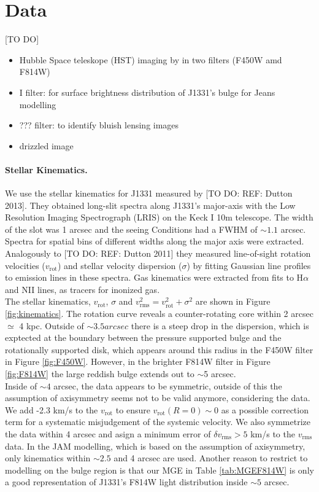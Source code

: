 \section{Data} \label{sec:data}

[TO DO]

\begin{itemize}
\item Hubble Space teleskope (HST) imaging by \cite{SWELLSI} in two filters (F450W amd F814W)
\item I filter: for surface brightness distribution of J1331's bulge for Jeans modelling
\item ??? filter: to identify bluish lensing images
\item drizzled image
\end{itemize}

\paragraph{Stellar Kinematics.} We use the stellar kinematics for J1331 measured by [TO DO: REF: Dutton 2013]. They obtained long-slit spectra along J1331's major-axis with the Low Resolution Imaging Spectrograph (LRIS) on the Keck I 10m telescope. The width of the slot was 1 arcsec and the seeing Conditions had a FWHM of $\sim 1.1$ arcsec. Spectra for spatial bins of different widths along the major axis were extracted. Analogously to [TO DO: REF: Dutton 2011] they measured line-of-sight rotation velocities ($v_\text{rot}$) and stellar velocity dispersion ($\sigma$) by fitting Gaussian line profiles to emission lines in these spectra. Gas kinematics were extracted from fits to H$\alpha$ and NII lines, as tracers for inonized gas.
\\The stellar kinematics, $v_\text{rot}$, $\sigma$ and $v_\text{rms}^2=v_\text{rot}^2 + \sigma^2$ are shown in Figure \ref{fig:kinematics}. The rotation curve reveals a counter-rotating core within 2 arcsec $\simeq$ 4 kpc. Outside of $\sim 3.5 arcsec$ there is a steep drop in the dispersion, which is exptected at the boundary between the pressure supported bulge and the rotationally supported disk, which appears around this radius in the F450W filter in Figure \ref{fig:F450W}. However, in the brighter F814W filter in Figure \ref{fig:F814W}  the large reddish bulge extends out to $\sim$5 arcsec. 
\\Inside of $\sim 4$ arcsec, the data appears to be symmetric, outside of this the assumption of axisymmetry seems not to be valid anymore, considering the data. We add -2.3 km/s to the $v_\text{rot}$ to ensure $v_\text{rot}(R=0) \sim 0$ as a possible correction term for a systematic misjudgement of the systemic velocity. We also symmetrize the data within 4 arcsec and asign a minimum error of $\delta v_\text{rms} > 5$ km/s to the $v_\text{rms}$ data. In the JAM modelling, which is based on the assumption of axisymmetry, only kinematics within $\sim 2.5$ and 4 arcsec are used. Another reason to restrict to modelling on the bulge region is that our MGE in Table \ref{tab:MGEF814W} is only a good representation of J1331's F814W light distribution inside $\sim 5$ arcsec.